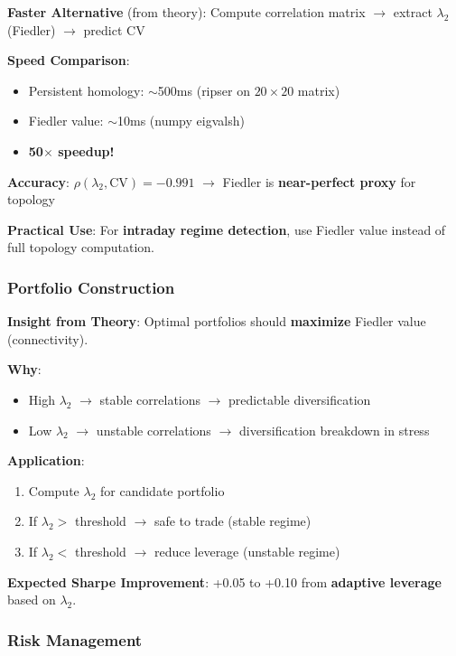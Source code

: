 \textbf{Faster Alternative} (from theory): Compute correlation matrix $\rightarrow$ extract $\lambda_2$ (Fiedler) $\rightarrow$ predict CV

\textbf{Speed Comparison}:
\begin{itemize}
\item Persistent homology: $\sim$500ms (ripser on $20\times 20$ matrix)
\item Fiedler value: $\sim$10ms (numpy eigvalsh)
\item \textbf{50$\times$ speedup!}
\end{itemize}

\textbf{Accuracy}: $\rho(\lambda_2, \text{CV}) = -0.991$ $\rightarrow$ Fiedler is \textbf{near-perfect proxy} for topology

\textbf{Practical Use}: For \textbf{intraday regime detection}, use Fiedler value instead of full topology computation.

\subsubsection{Portfolio Construction}

\textbf{Insight from Theory}: Optimal portfolios should \textbf{maximize} Fiedler value (connectivity).

\textbf{Why}:
\begin{itemize}
\item High $\lambda_2$ $\rightarrow$ stable correlations $\rightarrow$ predictable diversification
\item Low $\lambda_2$ $\rightarrow$ unstable correlations $\rightarrow$ diversification breakdown in stress
\end{itemize}

\textbf{Application}:
\begin{enumerate}
\item Compute $\lambda_2$ for candidate portfolio
\item If $\lambda_2 >$ threshold $\rightarrow$ safe to trade (stable regime)
\item If $\lambda_2 <$ threshold $\rightarrow$ reduce leverage (unstable regime)
\end{enumerate}

\textbf{Expected Sharpe Improvement}: +0.05 to +0.10 from \textbf{adaptive leverage} based on $\lambda_2$.

\subsubsection{Risk Management}

